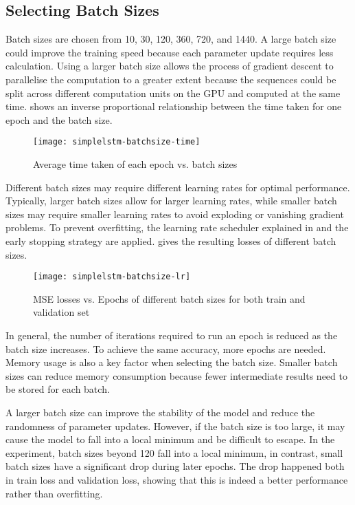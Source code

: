 \subsection{Selecting Batch Sizes}

Batch sizes are chosen from 10, 30, 120, 360, 720, and 1440. A large batch size could improve the training speed because each parameter update requires less calculation. 
Using a larger batch size allows the process of gradient descent to parallelise the computation to a greater extent because the sequences could be split across different computation units on the GPU and computed at the same time. 
 shows an inverse proportional relationship between the time taken for one epoch and the batch size. 

\begin{figure}[!htb]
    \centering
    \texttt{[image: simplelstm-batchsize-time]}
    \caption{Average time taken of each epoch vs. batch sizes}
    \label{Figure:simplelstm-batchsize-time}
\end{figure}

Different batch sizes may require different learning rates for optimal performance. Typically, larger batch sizes allow for larger learning rates, while smaller batch sizes may require smaller learning rates to avoid exploding or vanishing gradient problems.
To prevent overfitting, the learning rate scheduler explained in  and the early stopping strategy are applied.  gives the resulting losses of different batch sizes. 

\begin{figure}[!htb]
    \centering
    \texttt{[image: simplelstm-batchsize-lr]}
    \caption{MSE losses vs. Epochs of different batch sizes for both train and validation set}
    \label{Figure:simplelstm-batchsize}
\end{figure}

In general, the number of iterations required to run an epoch is reduced as the batch size increases. To achieve the same accuracy, more epochs are needed. 
Memory usage is also a key factor when selecting the batch size. Smaller batch sizes can reduce memory consumption because fewer intermediate results need to be stored for each batch. 

A larger batch size can improve the stability of the model and reduce the randomness of parameter updates. 
However, if the batch size is too large, it may cause the model to fall into a local minimum and be difficult to escape.
In the experiment, batch sizes beyond 120 fall into a local minimum, in contrast, small batch sizes have a significant drop during later epochs. 
The drop happened both in train loss and validation loss, showing that this is indeed a better performance rather than overfitting. 

